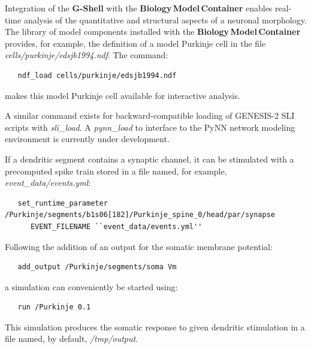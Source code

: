 \documentclass[11pt,3p,twocolumn]{JMN}
\begin{document}
Integration of the {\bf G-Shell} with the {\bf Biology\,Model\,Container} enables real-time analysis of the quantitative and structural aspects of a neuronal morphology.  The library of model components installed with the {\bf Biology\,Model\,Container} provides, for example, the definition of a model Purkinje cell in the file {\it cells/purkinje/edsjb1994.ndf}. The command:

\begin{tiny}
\begin{verbatim}
   ndf_load cells/purkinje/edsjb1994.ndf
\end{verbatim}
\end{tiny}
makes this model Purkinje cell available for interactive analysis.

A similar command exists for backward-compatible loading of GENESIS-2 SLI scripts with {\it sli\_load}.  A {\it pynn\_load} to interface to
the PyNN network modeling environment \cite{davison08:_pynn} is currently under development.

If a dendritic segment contains a synaptic channel, it can be stimulated with a precomputed spike train stored in a file named, for example, {\it event\_data/events.yml}:

\begin{tiny}
\begin{verbatim}
   set_runtime_parameter /Purkinje/segments/b1s06[182]/Purkinje_spine_0/head/par/synapse
      EVENT_FILENAME ``event_data/events.yml''
\end{verbatim}
\end{tiny}

Following the addition of an output for the somatic membrane potential:
\begin{tiny}
\begin{verbatim}
   add_output /Purkinje/segments/soma Vm
\end{verbatim}
a simulation can conveniently be started using:
\begin{verbatim}
   run /Purkinje 0.1
\end{verbatim}
\end{tiny}
This simulation produces the somatic response to given dendritic stimulation in a file named, by default, {\it /tmp/output}.
\end{document}
